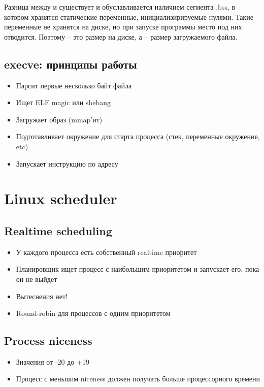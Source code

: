 Разница между  и  существует и обуславливается наличием сегмента .bss, в котором хранятся статические переменные, инициализирируемые нулями. Такие переменные не хранятся на диске, но при запуске программы место под них отводится. Поэтому  -- это размер на диске, а  -- размер загружаемого файла.

\subsection{execve: принципы работы}
  \begin{itemize}
    \item Парсит первые несколько байт файла
    \item Ищет ELF magic или shebang
    \item Загружает образ (mmap'ит)
    \item Подготавливает окружение для старта процесса (стек, переменные окружение, etc)
    \item Запускает инструкцию по адресу 
  \end{itemize}
  
\section{Linux scheduler}
  \subsection{Realtime scheduling}
    \begin{itemize}
      \item У каждого процесса есть собственный realtime приоритет
      \item Планировщик ищет процесс с наибольшим приоритетом и запускает его, пока он не выйдет
      \item Вытеснения нет!
      \item Round-robin для процессов с одним приоритетом
    \end{itemize}
  
  \subsection{Process niceness}
    \begin{itemize}
      \item Значения от -20 до +19
      \item Процесс с меньшим niceness должен получать больше процессорного времени
    \end{itemize}
  
